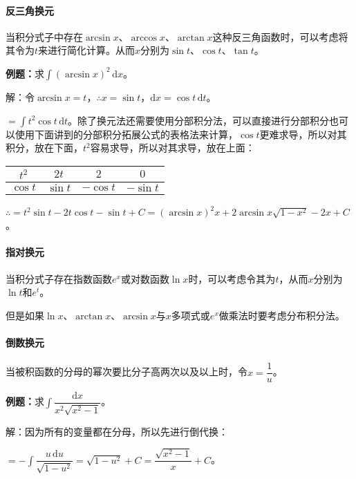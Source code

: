 \documentclass[UTF8, 12pt]{ctexart}
\begin{document}
\paragraph{反三角换元} \leavevmode \medskip

当积分式子中存在$\arcsin x$、$\arccos x$、$\arctan x$这种反三角函数时，可以考虑将其令为$t$来进行简化计算。从而$x$分别为$\sin t$、$\cos t$、$\tan t$。

\textbf{例题：}求$\int(\arcsin x)^2\,\textrm{d}x$。

解：令$\arcsin x=t$，$\therefore x=\sin t$，$\textrm{d}x=\cos t\,\textrm{d}t$。

$=\int t^2\cos t\,\textrm{d}t$。除了换元法还需要使用分部积分法，可以直接进行分部积分也可以使用下面讲到的分部积分拓展公式的表格法来计算，$\cos t$更难求导，所以对其积分，放在下面，$t^2$容易求导，所以对其求导，放在上面：\medskip

\begin{tabular}{|c|c|c|c|}
    \hline
    $t^2$ & $2t$ & $2$ & $0$ \\ \hline
    $\cos t$ & $\sin t$ & $-\cos t$ & $-\sin t$ \\
    \hline
\end{tabular} \medskip

$\therefore=t^2\sin t-2t\cos t-\sin t+C=(\arcsin x)^2x+2\arcsin x\sqrt{1-x^2}-2x+C$。

\paragraph{指对换元} \leavevmode \medskip

当积分式子存在指数函数$e^x$或对数函数$\ln x$时，可以考虑令其为$t$，从而$x$分别为$\ln t$和$e^t$。

但是如果$\ln x$、$\arctan x$、$\arcsin x$与$x$多项式或$e^x$做乘法时要考虑分布积分法。

\paragraph{倒数换元} \leavevmode \medskip

当被积函数的分母的幂次要比分子高两次以及以上时，令$x=\dfrac{1}{u}$。

\textbf{例题：}求$\displaystyle{\int\dfrac{\textrm{d}x}{x^2\sqrt{x^2-1}}}$。\medskip

解：因为所有的变量都在分母，所以先进行倒代换：\medskip

$=-\displaystyle{\int\dfrac{u\,\textrm{d}u}{\sqrt{1-u^2}}}=\sqrt{1-u^2}+C=\dfrac{\sqrt{x^2-1}}{x}+C$。
\end{document}

